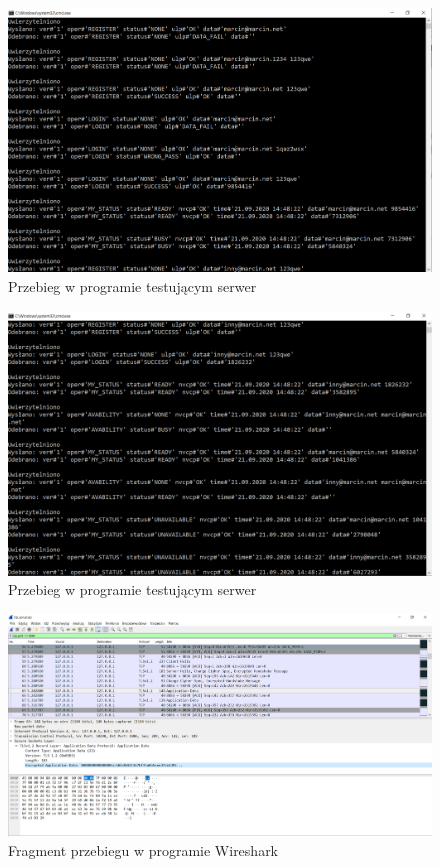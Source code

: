 \documentclass[12pt,a4paper]{article}
\begin{document}
	\begin{figure}[h!]
		\begin{center}
			\includegraphics*[width=.75\textwidth]{testy_1.png}
		\end{center}
		\caption{Przebieg w programie testującym serwer}
	\end{figure}

	\begin{figure}[h!]
		\begin{center}
			\includegraphics*[width=.75\textwidth]{testy_2.png}
		\end{center}
		\caption{Przebieg w programie testującym serwer}
	\end{figure}
	
	\pagebreak
	
	\begin{figure}[h!]
		\begin{center}
			\includegraphics*[width=.95\textwidth]{wire_1.png}
		\end{center}
		\caption{Fragment przebiegu w programie Wireshark}
	\end{figure}
\end{document}
